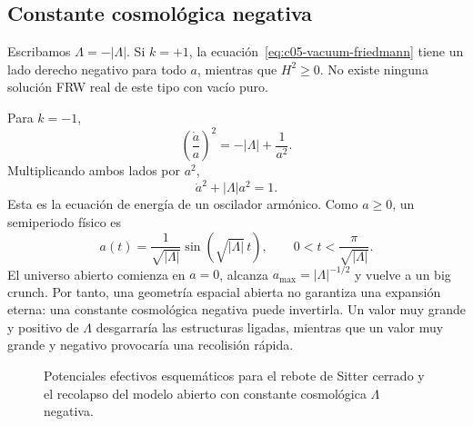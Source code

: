 \subsection{Constante cosmológica negativa}

Escribamos \(\Lambda=-|\Lambda|\). Si \(k=+1\), la ecuación~\eqref{eq:c05-vacuum-friedmann} tiene un lado derecho negativo para todo \(a\), mientras que \(H^2\geq0\). No existe ninguna solución FRW real de este tipo con vacío puro.

Para \(k=-1\),
\begin{equation}
\left(\frac{\dot a}{a}\right)^2=-|\Lambda|+\frac{1}{a^2}.
\end{equation}
Multiplicando ambos lados por \(a^2\),
\begin{equation}
\dot a^2+|\Lambda|a^2=1.
\label{eq:c05-negative-lambda-oscillator}
\end{equation}
Esta es la ecuación de energía de un oscilador armónico. Como \(a\geq0\), un semiperiodo físico es
\begin{equation}
a(t)=\frac{1}{\sqrt{|\Lambda|}}
\sin\!\left(\sqrt{|\Lambda|}\,t\right),
\qquad
0<t<\frac{\pi}{\sqrt{|\Lambda|}}.
\end{equation}
El universo abierto comienza en \(a=0\), alcanza \(a_{\max}=|\Lambda|^{-1/2}\) y vuelve a un big crunch. Por tanto, una geometría espacial abierta no garantiza una expansión eterna: una constante cosmológica negativa puede invertirla. Un valor muy grande y positivo de \(\Lambda\) desgarraría las estructuras ligadas, mientras que un valor muy grande y negativo provocaría una recolisión rápida.

\begin{figure}[htbp]
\centering
{}
\hspace{2em}\caption{Potenciales efectivos esquemáticos para el rebote de Sitter cerrado y el recolapso del modelo abierto con constante cosmológica \(\Lambda\) negativa.}
\label{fig:c05-mechanical-potentials}
\end{figure}

